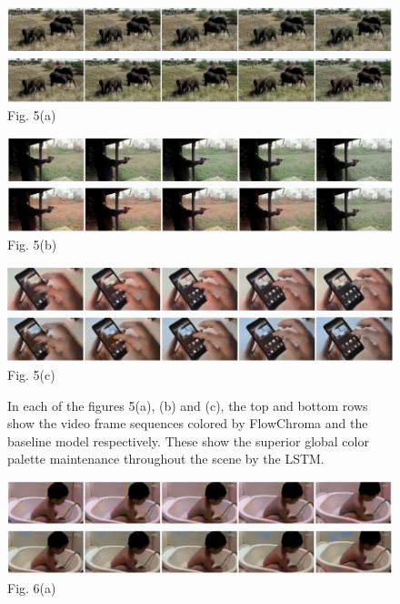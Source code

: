 \documentclass[10pt,twocolumn,letterpaper]{article}
\begin{document}
\begin{figure}[!h]
	\includegraphics[width=\textwidth]{fc-dk-elephants.jpg}
    \centering
    \label{}{\footnotesize Fig. 5(a)}
\end{figure}
\begin{figure}[!h]
	\includegraphics[width=\textwidth]{fc-dk-shooting.png}
	\centering    
    \label{}{\footnotesize Fig. 5(b)}
\end{figure}
\begin{figure}[!h]
	\includegraphics[width=\textwidth]{fc-dk-mobile-phone.jpg}
	\centering
    \label{center}{\footnotesize Fig. 5(c)}
    \caption{In each of the figures 5(a), (b) and (c), the top and bottom rows show the video frame sequences colored by FlowChroma and the baseline model respectively. These show the superior global color palette maintenance throughout the scene by the LSTM.}
\end{figure}

\begin{figure}[!h]
\includegraphics[width=\textwidth]{fc-dk-baby-tub.png}
\centering
\label{}{\footnotesize Fig. 6(a)}
\vspace{5.00mm}
\end{figure}
\end{document}
